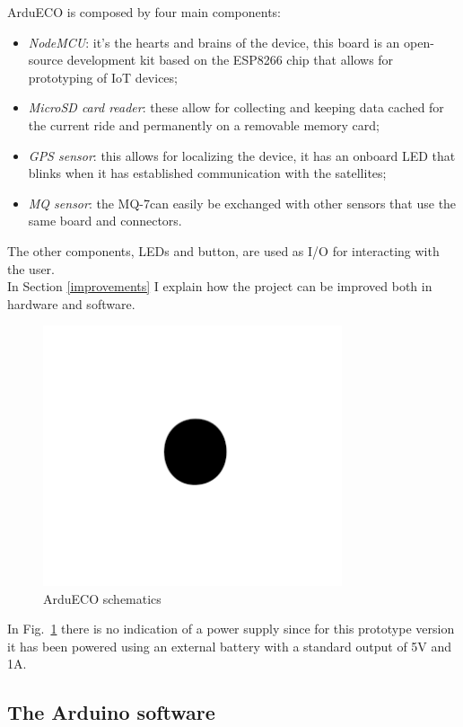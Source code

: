 \documentclass[conference]{IEEEtran}
\begin{document}
		ArduECO is composed by four main components:
		\begin{itemize}
			\item \textit{NodeMCU}: it's the hearts and brains of the device, this board is an open-source development kit based on the ESP8266 chip that allows for prototyping of IoT devices;
			\item \textit{MicroSD card reader}: these allow for collecting and keeping data cached for the current ride and permanently on a removable memory card;
			\item \textit{GPS sensor}: this allows for localizing the device, it has an onboard LED that blinks when it has established communication with the satellites;
			\item \textit{MQ sensor}: the MQ-7can easily be exchanged with other sensors that use the same board and connectors.
		\end{itemize}
		The other components, LEDs and button, are used as I/O for interacting with the user.\\
		In Section \ref{improvements} I explain how the project can be improved both in hardware and software.
		\begin{figure}[htbp]
			\centerline{\includegraphics[width=8.8cm]{fig1.png}}
			\caption{ArduECO schematics}
			\label{schematics}
		\end{figure}
		In Fig.~\ref{schematics} there is no indication of a power supply since for this prototype version it has been powered using an external battery with a standard output of 5V and 1A.
	
	\subsection{The Arduino software}
	
\end{document}
